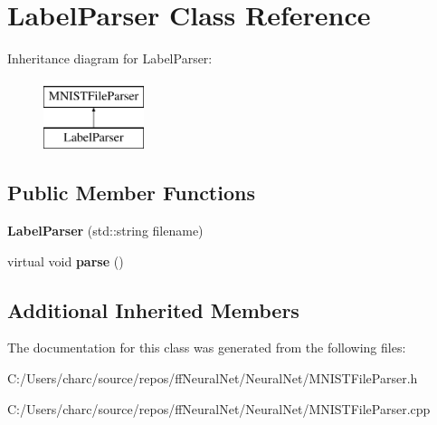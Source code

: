 \hypertarget{class_label_parser}{}\section{Label\+Parser Class Reference}
\label{class_label_parser}
Inheritance diagram for Label\+Parser\+:\begin{figure}[H]
\begin{center}
\leavevmode
\includegraphics[height=2.000000cm]{class_label_parser}
\end{center}
\end{figure}
\subsection*{Public Member Functions}
\begin{DoxyCompactItemize}
\item 
\mbox{\label{class_label_parser_a42e1312b018e61d541562197b304c31a}} 
{\bfseries Label\+Parser} (std\+::string filename)
\item 
\mbox{\label{class_label_parser_af8bd2f907738f36487f7220ec792fc43}} 
virtual void {\bfseries parse} ()
\end{DoxyCompactItemize}
\subsection*{Additional Inherited Members}


The documentation for this class was generated from the following files\+:\begin{DoxyCompactItemize}
\item 
C\+:/\+Users/charc/source/repos/ff\+Neural\+Net/\+Neural\+Net/M\+N\+I\+S\+T\+File\+Parser.\+h\item 
C\+:/\+Users/charc/source/repos/ff\+Neural\+Net/\+Neural\+Net/M\+N\+I\+S\+T\+File\+Parser.\+cpp\end{DoxyCompactItemize}
